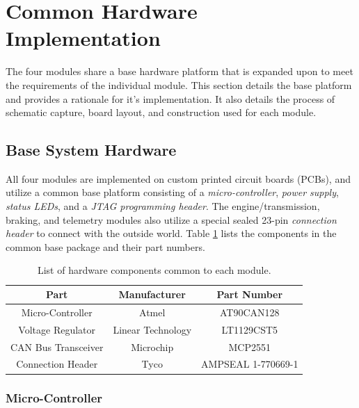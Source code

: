 \section{Common Hardware Implementation\label{sec:common_hardware_implementation}}

The four modules share a base hardware platform that is expanded upon to meet the requirements of the individual module. This section details the base platform and provides a rationale for it's implementation. It also details the process of schematic capture, board layout, and construction used for each module.


\subsection{Base System Hardware\label{sec:base_system_hardware}}

All four modules are implemented on custom printed circuit boards (PCBs), and utilize a common base platform consisting of a \emph{micro-controller}, \emph{power supply}, \emph{status LEDs}, and a \emph{JTAG programming header}. The engine/transmission, braking, and telemetry modules also utilize a special sealed 23-pin \emph{connection header} to connect with the outside world. Table \ref{tab:common_module_components} lists the components in the common base package and their part numbers.

\begin{table}[H]
	\caption{List of hardware components common to each module.}
	\label{tab:common_module_components}
	\centering
	\begin{tabular}{|c|c|c|}
		\hline 
		Part & Manufacturer & Part Number \\ 
		\hline \hline
		Micro-Controller & Atmel & AT90CAN128 \\
		\hline
		Voltage Regulator & Linear Technology & LT1129CST5 \\
		\hline
		CAN Bus Transceiver & Microchip & MCP2551 \\
		\hline
		Connection Header & Tyco & AMPSEAL 1-770669-1 \\
		\hline
	\end{tabular}
\end{table}

\subsubsection{Micro-Controller}

